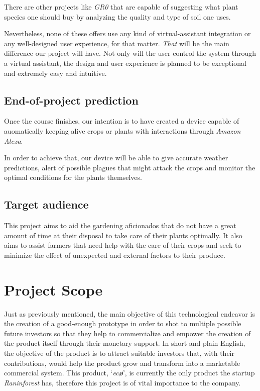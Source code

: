 \documentclass[english,runningheads,a4paper]{llncs}[2018/03/10]
\begin{document}
    There are other projects like \textit{GR0} that are capable of suggesting
    what plant species one should buy by analyzing the quality and type of soil
    one uses.

    Nevertheless, none of these offers use any kind of virtual-assistant
    integration or any well-designed user experience, for that matter.
    \textit{That} will be the main difference our project will have. Not only
    will the user control the system through a virtual assistant, the design and
    user experience is planned to be exceptional and extremely easy and
    intuitive.


    \subsection*{End-of-project prediction}

    Once the course finishes, our intention is to have created a device capable
    of auomatically keeping alive crops or plants with interactions through
    \textit{Amazon Alexa}.

    In order to achieve that, our device will be able to give accurate weather
    predictions, alert of possible plagues that might attack the crops and
    monitor the optimal conditions for the plants themselves.


    \subsection*{Target audience}

    This project aims to aid the gardening aficionados that do not have a great
    amount of time at their disposal to take care of their plants optimally. It
    also aims to assist farmers that need help with the care of their crops and
    seek to minimize the effect of unexpected and external factors to their
    produce.


\section*{Project Scope}

Just as previously mentioned, the main objective of this technological endeavor
is the creation of a good-enough prototype in order to shot to multiple possible
future investors so that they help to commercialize and empower the creation of
the product itself through their monetary support. In short and plain English,
the objective of the product is to attract suitable investors that, with their
contributions, would help the product grow and transform into a marketable
commercial system. This product, `\textit{ec\textbf{\o}}', is currently the
only product the startup \textit{Raninforest} has, therefore this project is of
vital importance to the company.
\end{document}
